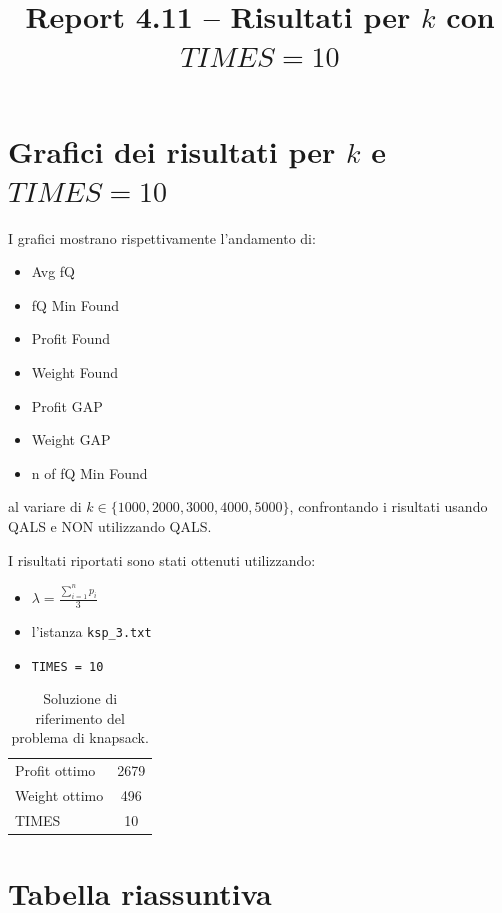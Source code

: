 \documentclass[a4paper,12pt]{article}
\title{Report 4.11 -- Risultati per $k$ con $TIMES = 10$}
\begin{document}
\maketitle

\newpage

\section{Grafici dei risultati per $k$ e $TIMES = 10$}

I grafici mostrano rispettivamente l'andamento di:
\begin{itemize}
    \item Avg fQ
    \item fQ Min Found
    \item Profit Found
    \item Weight Found
    \item Profit GAP
    \item Weight GAP
    \item n of fQ Min Found
\end{itemize}
al variare di $k \in \{1000, 2000, 3000, 4000, 5000\}$, confrontando
i risultati usando QALS e NON utilizzando QALS.

I risultati riportati sono stati ottenuti utilizzando:

\begin{itemize}
    \item $\lambda = \frac{\sum_{i=1}^{n} p_i}{3}$
    \item l'istanza \texttt{ksp\_3.txt}
    \item \texttt{TIMES = 10}
\end{itemize}

\begin{table}[H]
\centering
\begin{tabular}{lc}
\toprule
Profit ottimo & 2679 \\
Weight ottimo & 496 \\
TIMES & 10 \\
\bottomrule
\end{tabular}
\caption{Soluzione di riferimento del problema di knapsack.}
\end{table}

\section{Tabella riassuntiva}
\end{document}
